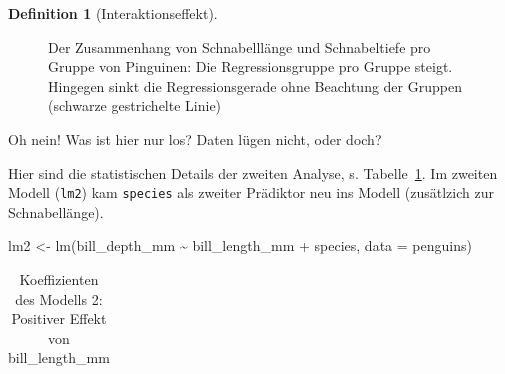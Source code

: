 \documentclass[
  letterpaper,
]{scrbook}
\newenvironment{Shaded}{\begin{snugshade}}{\end{snugshade}}
\newcommand{\AttributeTok}[1]{\textcolor[rgb]{0.40,0.45,0.13}{#1}}
\newcommand{\FunctionTok}[1]{\textcolor[rgb]{0.28,0.35,0.67}{#1}}
\newcommand{\NormalTok}[1]{\textcolor[rgb]{0.00,0.23,0.31}{#1}}
\newcommand{\OtherTok}[1]{\textcolor[rgb]{0.00,0.23,0.31}{#1}}
\newcommand{\SpecialCharTok}[1]{\textcolor[rgb]{0.37,0.37,0.37}{#1}}
\theoremstyle{definition}
\theoremstyle{definition}
\theoremstyle{definition}
\newtheorem{definition}{Definition}[chapter]
\theoremstyle{remark}
\begin{document}
\begin{definition}[Interaktionseffekt]
\begin{figure}
{}

\caption{\label{fig-penguins-groups}Der Zusammenhang von Schnabelllänge
und Schnabeltiefe pro Gruppe von Pinguinen: Die Regressionsgruppe pro
Gruppe steigt. Hingegen sinkt die Regressionsgerade ohne Beachtung der
Gruppen (schwarze gestrichelte Linie)}

\end{figure}%

Oh nein! Was ist hier nur los? Daten lügen nicht, oder doch?

Hier sind die statistischen Details der zweiten Analyse, s.
Tabelle~\ref{tbl-peng-simpson2}. Im zweiten Modell (\texttt{lm2}) kam
\texttt{species} als zweiter Prädiktor neu ins Modell (zusätlzich zur
Schnabellänge).

\begin{Shaded}
\begin{Highlighting}[]
\NormalTok{lm2 }\OtherTok{\textless{}{-}} \FunctionTok{lm}\NormalTok{(bill\_depth\_mm }\SpecialCharTok{\textasciitilde{}}\NormalTok{ bill\_length\_mm }\SpecialCharTok{+}\NormalTok{ species, }\AttributeTok{data =}\NormalTok{ penguins)}
\end{Highlighting}
\end{Shaded}

\begin{longtable}[]{@{}
  >{\raggedright\arraybackslash}p{}
  >{\centering\arraybackslash}p{}
  >{\centering\arraybackslash}p{}
  >{\centering\arraybackslash}p{}
  >{\centering\arraybackslash}p{}
  >{\centering\arraybackslash}p{}@{}}

\caption{\label{tbl-peng-simpson2}Koeffizienten des Modells 2: Positiver
Effekt von bill\_length\_mm}

\tabularnewline


\end{longtable}
\end{definition}
\end{document}
